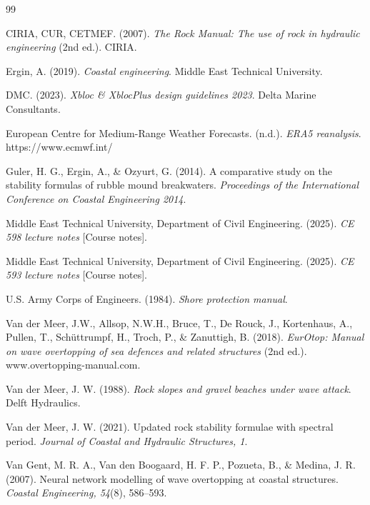 \documentclass[a4paper, 11pt]{article}
\begin{document}
\begin{thebibliography}{99}

CIRIA, CUR, CETMEF. (2007). \textit{The Rock Manual: The use of rock in hydraulic engineering} (2nd ed.). CIRIA.

\bibitem{}
Ergin, A. (2019). \textit{Coastal engineering}. Middle East 
Technical University.

DMC. (2023). \textit{Xbloc \& XblocPlus design guidelines 2023}. 
Delta Marine Consultants.

European Centre for Medium-Range Weather Forecasts. (n.d.). \textit{ERA5 reanalysis}. https://www.ecmwf.int/

\bibitem{}
Guler, H. G., Ergin, A., \& Ozyurt, G. (2014). A comparative 
study on the stability formulas of rubble mound breakwaters. 
\textit{Proceedings of the International Conference on Coastal 
Engineering 2014}.

Middle East Technical University, Department of Civil Engineering. (2025). \textit{CE 598 lecture notes} [Course notes].

Middle East Technical University, Department of Civil Engineering. (2025). \textit{CE 593 lecture notes} [Course notes].

U.S. Army Corps of Engineers. (1984). \textit{Shore protection manual}.

Van der Meer, J.W., Allsop, N.W.H., Bruce, T., De Rouck, J., 
Kortenhaus, A., Pullen, T., Sch\"{u}ttrumpf, H., Troch, P., 
\& Zanuttigh, B. (2018). \textit{EurOtop: Manual on wave 
overtopping of sea defences and related structures} (2nd ed.). 
www.overtopping-manual.com.

\bibitem{}
Van der Meer, J. W. (1988). \textit{Rock slopes and gravel 
beaches under wave attack}. Delft Hydraulics.

\bibitem{}
Van der Meer, J. W. (2021). Updated rock stability formulae 
with spectral period. \textit{Journal of Coastal and Hydraulic 
Structures, 1}.

\bibitem{}
Van Gent, M. R. A., Van den Boogaard, H. F. P., Pozueta, B., 
\& Medina, J. R. (2007). Neural network modelling of wave 
overtopping at coastal structures. \textit{Coastal Engineering, 
54}(8), 586--593.

\end{thebibliography}
\newpage

\appendix
\end{document}
